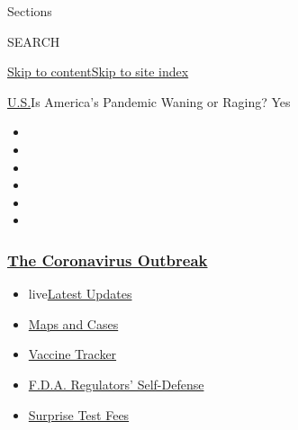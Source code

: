 Sections

SEARCH

\protect\hyperlink{site-content}{Skip to
content}\protect\hyperlink{site-index}{Skip to site index}

\href{/section/us}{U.S.}\textbar{}Is America's Pandemic Waning or
Raging? Yes

\begin{itemize}
\item
\item
\item
\item
\item
\item
\end{itemize}

\hypertarget{the-coronavirus-outbreak}{%
\subsubsection{\texorpdfstring{\href{https://www.nytimes3xbfgragh.onion/news-event/coronavirus?name=styln-coronavirus-national\&region=TOP_BANNER\&block=storyline_menu_recirc\&action=click\&pgtype=Article\&impression_id=57902710-f4be-11ea-8f23-0589e0816c94\&variant=undefined}{The
Coronavirus
Outbreak}}{The Coronavirus Outbreak}}\label{the-coronavirus-outbreak}}

\begin{itemize}
\tightlist
\item
  live\href{https://www.nytimes3xbfgragh.onion/2020/09/11/world/covid-19-coronavirus.html?name=styln-coronavirus-national\&region=TOP_BANNER\&block=storyline_menu_recirc\&action=click\&pgtype=Article\&impression_id=57902711-f4be-11ea-8f23-0589e0816c94\&variant=undefined}{Latest
  Updates}
\item
  \href{https://www.nytimes3xbfgragh.onion/interactive/2020/us/coronavirus-us-cases.html?name=styln-coronavirus-national\&region=TOP_BANNER\&block=storyline_menu_recirc\&action=click\&pgtype=Article\&impression_id=57902712-f4be-11ea-8f23-0589e0816c94\&variant=undefined}{Maps
  and Cases}
\item
  \href{https://www.nytimes3xbfgragh.onion/interactive/2020/science/coronavirus-vaccine-tracker.html?name=styln-coronavirus-national\&region=TOP_BANNER\&block=storyline_menu_recirc\&action=click\&pgtype=Article\&impression_id=57904e20-f4be-11ea-8f23-0589e0816c94\&variant=undefined}{Vaccine
  Tracker}
\item
  \href{https://www.nytimes3xbfgragh.onion/2020/09/10/us/politics/fda-coronavirus-vaccine.html?name=styln-coronavirus-national\&region=TOP_BANNER\&block=storyline_menu_recirc\&action=click\&pgtype=Article\&impression_id=57904e21-f4be-11ea-8f23-0589e0816c94\&variant=undefined}{F.D.A.
  Regulators' Self-Defense}
\item
  \href{https://www.nytimes3xbfgragh.onion/2020/09/09/upshot/coronavirus-surprise-test-fees.html?name=styln-coronavirus-national\&region=TOP_BANNER\&block=storyline_menu_recirc\&action=click\&pgtype=Article\&impression_id=57904e22-f4be-11ea-8f23-0589e0816c94\&variant=undefined}{Surprise
  Test Fees}
\end{itemize}


